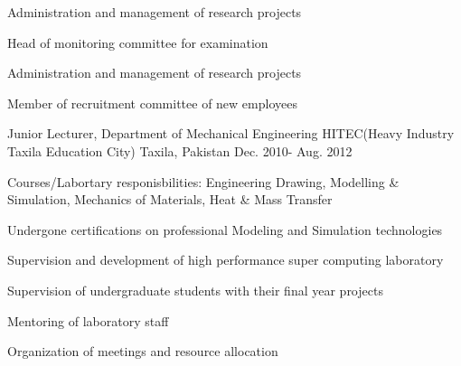 \begin{cventries}
{\begin{cvitems}
\item {Administration and management of research projects}
\item {Head of monitoring committee for examination}
\item {Administration and management of research projects}
\item {Member of recruitment committee of new employees}
	\end{cvitems}
}
 \cventry
    {Junior Lecturer, Department of Mechanical Engineering} %
    {HITEC(Heavy Industry Taxila Education City)} %
    {Taxila, Pakistan} %
    {Dec. 2010- Aug. 2012} %
    {
      \begin{cvitems} %
        \item {Courses/Labortary responisbilities: Engineering Drawing, Modelling \& Simulation, Mechanics of Materials, Heat \& Mass Transfer} 
        \item {Undergone  certifications on professional Modeling and Simulation technologies}
        \item{Supervision and development of high performance super computing laboratory}
        \item {Supervision of undergraduate students with their final year projects}
          \item {Mentoring of laboratory staff}
          \item{Organization of meetings and resource allocation}
      \end{cvitems}
    }
\end{cventries}